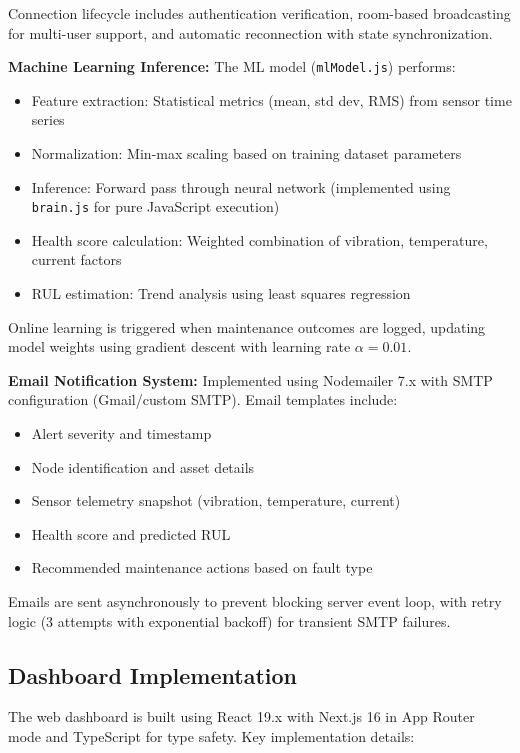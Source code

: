\documentclass[conference]{IEEEtran}
\begin{document}
Connection lifecycle includes authentication verification, room-based broadcasting for multi-user support, and automatic reconnection with state synchronization.

\textbf{Machine Learning Inference:} The ML model (\texttt{mlModel.js}) performs:
\begin{itemize}
\item Feature extraction: Statistical metrics (mean, std dev, RMS) from sensor time series
\item Normalization: Min-max scaling based on training dataset parameters
\item Inference: Forward pass through neural network (implemented using \texttt{brain.js} for pure JavaScript execution)
\item Health score calculation: Weighted combination of vibration, temperature, current factors
\item RUL estimation: Trend analysis using least squares regression
\end{itemize}

Online learning is triggered when maintenance outcomes are logged, updating model weights using gradient descent with learning rate $\alpha = 0.01$.

\textbf{Email Notification System:} Implemented using Nodemailer 7.x with SMTP configuration (Gmail/custom SMTP). Email templates include:
\begin{itemize}
\item Alert severity and timestamp
\item Node identification and asset details
\item Sensor telemetry snapshot (vibration, temperature, current)
\item Health score and predicted RUL
\item Recommended maintenance actions based on fault type
\end{itemize}

Emails are sent asynchronously to prevent blocking server event loop, with retry logic (3 attempts with exponential backoff) for transient SMTP failures.

\subsection{Dashboard Implementation}

The web dashboard is built using React 19.x with Next.js 16 in App Router mode and TypeScript for type safety. Key implementation details:
\end{document}
